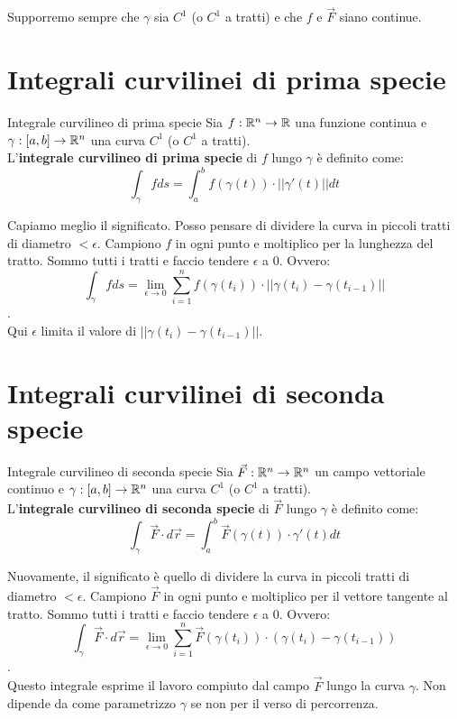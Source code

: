 \begin{osservazione}{}
  Supporremo sempre che $\gamma$ sia $C^1$ (o $C^1$ a tratti) e che $f$ e $\vec F$ siano continue.
\end{osservazione}

\section{Integrali curvilinei di prima specie}
\begin{definizione}{Integrale curvilineo di prima specie}
  Sia $f: \mathbb{R}^n \rightarrow \mathbb{R}$ una funzione continua e $\gamma: [a, b] \rightarrow \mathbb{R}^n$ una curva $C^1$ (o $C^1$ a tratti).\\
  L'\textbf{integrale curvilineo di prima specie} di $f$ lungo $\gamma$ è definito come:
  $$\int_\gamma f ds = \int_a^b f(\gamma(t)) \cdot ||\gamma'(t)|| dt$$
\end{definizione}

Capiamo meglio il significato. Posso pensare di dividere la curva in piccoli tratti di diametro $< \epsilon$. Campiono $f$ in ogni punto e moltiplico per la lunghezza del tratto. Sommo tutti i tratti e faccio tendere $\epsilon$ a 0. Ovvero:
$$\int_\gamma f ds = \lim_{\epsilon \rightarrow 0} \sum_{i=1}^n f(\gamma(t_i)) \cdot ||\gamma(t_i) - \gamma(t_{i-1})||$$.\\
Qui $\epsilon$ limita il valore di $||\gamma(t_i) - \gamma(t_{i-1})||$.\\

\section{Integrali curvilinei di seconda specie}\label{sec:integrali-curvilinei-di-seconda-specie}
\begin{definizione}{Integrale curvilineo di seconda specie}
  Sia $\vec F: \mathbb{R}^n \rightarrow \mathbb{R}^n$ un campo vettoriale continuo e $\gamma: [a, b] \rightarrow \mathbb{R}^n$ una curva $C^1$ (o $C^1$ a tratti).\\
  L'\textbf{integrale curvilineo di seconda specie} di $\vec F$ lungo $\gamma$ è definito come:
  $$\int_\gamma \vec F \cdot d\vec r = \int_a^b \vec F(\gamma(t)) \cdot \gamma'(t) dt$$
\end{definizione}

Nuovamente, il significato è quello di dividere la curva in piccoli tratti di diametro $< \epsilon$. Campiono $\vec F$ in ogni punto e moltiplico per il vettore tangente al tratto. Sommo tutti i tratti e faccio tendere $\epsilon$ a 0. Ovvero:
$$\int_\gamma \vec F \cdot d\vec r = \lim_{\epsilon \rightarrow 0} \sum_{i=1}^n \vec F(\gamma(t_i)) \cdot (\gamma(t_i) - \gamma(t_{i-1}))$$.\\
Questo integrale esprime il lavoro compiuto dal campo $\vec F$ lungo la curva $\gamma$. Non dipende da come parametrizzo $\gamma$ se non per il verso di percorrenza.

